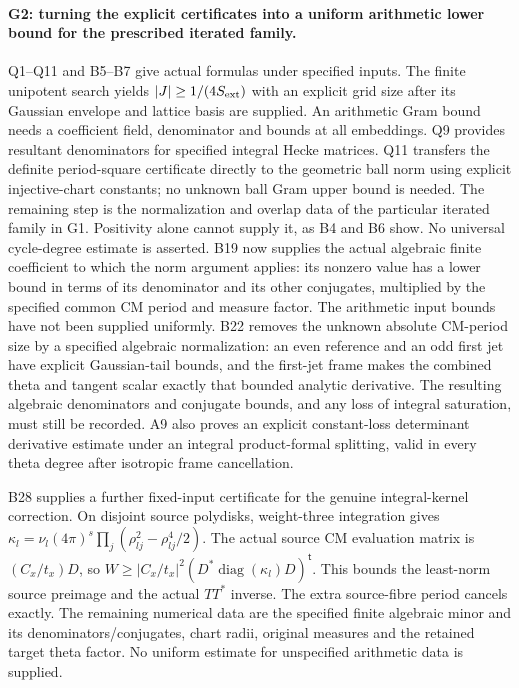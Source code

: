 \paragraph{G2: turning the explicit certificates into a uniform
arithmetic lower bound for the prescribed iterated family.}
Q1--Q11 and B5--B7 give actual formulas under specified inputs.
The finite unipotent search yields $|J|\geq1/(4S_{\rm ext})$ with
an explicit grid size after its Gaussian envelope and lattice basis
are supplied. An arithmetic Gram bound needs a coefficient field,
denominator and bounds at all embeddings. Q9 provides resultant
denominators for specified integral Hecke matrices. Q11 transfers
the definite period-square certificate directly to the geometric
ball norm using explicit injective-chart constants; no unknown
ball Gram upper bound is needed. The remaining
step is the normalization and overlap data of the particular
iterated family in G1. Positivity alone cannot supply it, as B4
and B6 show. No universal cycle-degree estimate is asserted.
B19 now supplies the actual algebraic finite coefficient to
which the norm argument applies: its nonzero value has a lower
bound in terms of its denominator and its other conjugates,
multiplied by the specified common CM period and measure factor.
The arithmetic input bounds have not been supplied uniformly.
B22 removes the unknown absolute CM-period size by a specified
algebraic normalization: an even reference and an odd first jet
have explicit Gaussian-tail bounds, and the first-jet frame
makes the combined theta and tangent scalar exactly that
bounded analytic derivative. The resulting algebraic
denominators and conjugate bounds, and any loss of integral
saturation, must still be recorded. A9 also proves an explicit
constant-loss determinant derivative estimate under an integral
product-formal splitting, valid in every theta degree after
isotropic frame cancellation.

B28 supplies a further fixed-input certificate for the genuine
integral-kernel correction. On disjoint source polydisks,
weight-three integration gives
$\kappa_l=\nu_l(4\pi)^s\prod_j(\rho_{lj}^2-\rho_{lj}^4/2)$.
The actual source CM evaluation matrix is $(C_x/t_x)D$,
so $W\geq|C_x/t_x|^2(D^*\operatorname{diag}(\kappa_l)D)^{\mathsf t}$.
This bounds the least-norm source preimage and the actual
$TT^*$ inverse. The extra source-fibre period cancels exactly.
The remaining numerical data are the specified finite
algebraic minor and its denominators/conjugates, chart radii,
original measures and the retained target theta factor.
No uniform estimate for unspecified arithmetic data is supplied.

